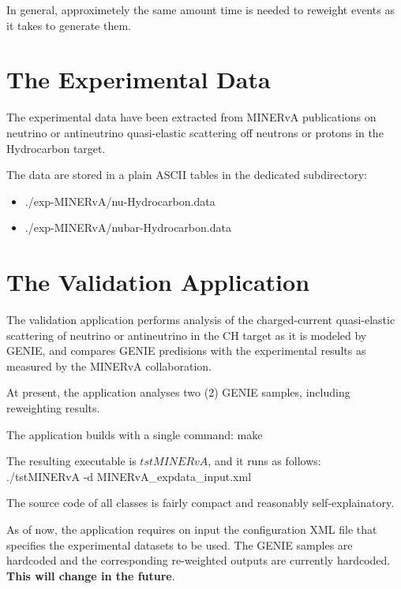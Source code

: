 In general, approximetely the same amount time is needed to reweight events as it takes to generate them.

\section{The Experimental Data}

The experimental data have been extracted from MINERvA publications\cite{minerva1} on neutrino or antineutrino 
quasi-elastic scattering off neutrons or protons in the Hydrocarbon target. 

The data are stored in a plain ASCII tables in the dedicated subdirectory:
\begin{itemize}
\item{./exp-MINERvA/nu-Hydrocarbon.data}
\item{./exp-MINERvA/nubar-Hydrocarbon.data}
\end{itemize}

\section{The Validation Application}

The validation application performs analysis of the charged-current quasi-elastic scattering of neutrino 
or antineutrino in the CH target as it is modeled by GENIE, and compares GENIE predisions with the
experimental results as measured by the MINERvA collaboration.

At present, the application analyses two (2) GENIE samples, including reweighting results.

The application builds with a single command: 
make

The resulting executable is $tstMINERvA$, and it runs as follows: \\
./tstMINERvA -d MINERvA\_expdata\_input.xml

The source code of all classes is fairly compact and reasonably self-explainatory.

As of now, the application requires on input the configuration XML file that specifies the experimental
datasets to be used. The GENIE samples are hardcoded and the corresponding re-weighted outputs are currently 
hardcoded. {\bf This will change in the future}.

